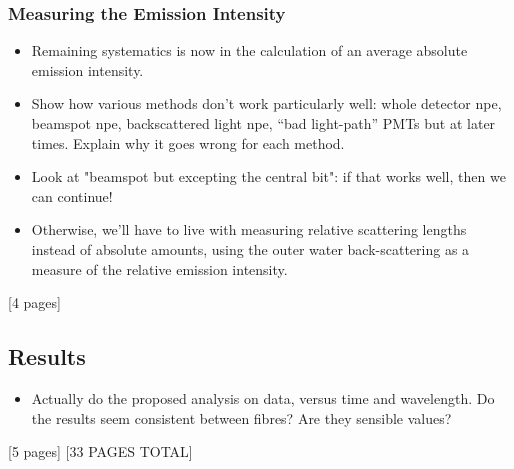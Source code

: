 {\subsubsection{Measuring the Emission Intensity}\label{sec:smellie_intensity}
\begin{itemize}
    \item Remaining systematics is now in the calculation of an average absolute emission intensity.
    \item Show how various methods don't work particularly well: whole detector npe, beamspot npe, backscattered light npe, ``bad light-path'' PMTs but at later times. Explain why it goes wrong for each method.
    \item Look at "beamspot but excepting the central bit": if that works well, then we can continue!
    \item Otherwise, we'll have to live with measuring relative scattering lengths instead of absolute amounts, using the outer water back-scattering as a measure of the relative emission intensity.
\end{itemize}
[4 pages]
\subsection{Results}
\begin{itemize}
    \item Actually do the proposed analysis on data, versus time and wavelength. Do the results seem consistent between fibres? Are they sensible values?
\end{itemize}
[5 pages]
[33 PAGES TOTAL]
}